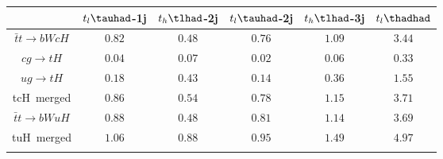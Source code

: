 \centering
\begin{tabular}{cccccc} \toprule\toprule
 & $t_{l}\tauhad$-1j & $t_{h}\tlhad$-2j & $t_{l}\tauhad$-2j & $t_{h}\tlhad$-3j & $t_{l}\thadhad$\\\midrule
$\bar{t}t\to bWcH$ & $0.82$ & $0.48$ & $0.76$ & $1.09$ & $3.44$\\
$cg\to tH$ & $0.04$ & $0.07$ & $0.02$ & $0.06$ & $0.33$\\
$ug\to tH$ & $0.18$ & $0.43$ & $0.14$ & $0.36$ & $1.55$\\
tcH~merged & $0.86$ & $0.54$ & $0.78$ & $1.15$ & $3.71$\\
$\bar{t}t\to bWuH$ & $0.88$ & $0.48$ & $0.81$ & $1.14$ & $3.69$\\
tuH~merged & $1.06$ & $0.88$ & $0.95$ & $1.49$ & $4.97$\\
\bottomrule\bottomrule\\
\end{tabular}
